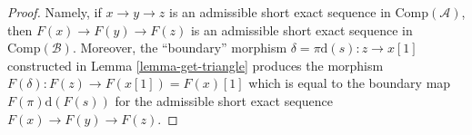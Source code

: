 \documentclass[10pt,a4paper]{amsart}
\theoremstyle{plain}
\theoremstyle{definition}
\theoremstyle{remark}
\numberwithin{equation}{subsection}
\begin{document}
\begin{proof}
Namely, if $x \to y \to z$ is an admissible short exact sequence
in $\text{Comp}(\mathcal{A})$, then $F(x) \to F(y) \to F(z)$
is an admissible short exact sequence in $\text{Comp}(\mathcal{B})$.
Moreover, the ``boundary'' morphism $\delta = \pi\text{d}(s) : z \to x[1]$
constructed in Lemma \ref{lemma-get-triangle} produces the morphism
$F(\delta) : F(z) \to F(x[1]) = F(x)[1]$ which is equal to the boundary
map $F(\pi) \text{d}(F(s))$ for the admissible short exact sequence
$F(x) \to F(y) \to F(z)$.
\end{proof}
\end{document}
